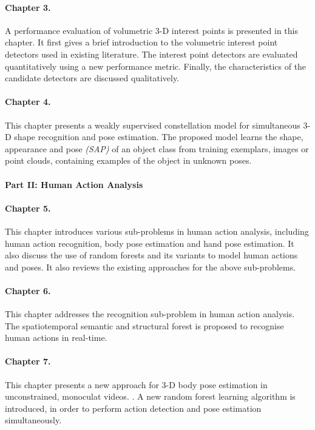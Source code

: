 \paragraph{Chapter 3.} 
A performance evaluation of volumetric 3-D interest points is presented in this chapter. 
It first gives a brief introduction to the volumetric interest point detectors used in existing literature.
The interest point detectors are evaluated quantitatively using a new performance metric.
Finally, the characteristics of the candidate detectors are discussed qualitatively. 

\paragraph{Chapter 4.}
This chapter presents a weakly supervised constellation model for simultaneous 3-D shape recognition and pose estimation. 
The proposed model learns the shape, appearance and pose \emph{(SAP)} of an object class from training exemplars, \eg images or point clouds, containing examples of the object in unknown poses.  

\paragraph{Part II: Human Action Analysis}

\paragraph{Chapter 5.} 
This chapter introduces various sub-problems in human action analysis, including human action recognition, body pose estimation and hand pose estimation. 
It also discuss the use of random forests and its variants to model human actions and poses.    
It also reviews the existing approaches for the above sub-problems. 

\paragraph{Chapter 6.} 
This chapter addresses the recognition sub-problem in human action analysis. The spatiotemporal semantic and structural forest is proposed to recognise human actions in real-time.    

\paragraph{Chapter 7.} 
This chapter presents a new approach for 3-D body pose estimation in unconstrained, monoculat videos. .   
A new random forest learning algorithm is introduced, in order to perform action detection and pose estimation simultaneously. 


